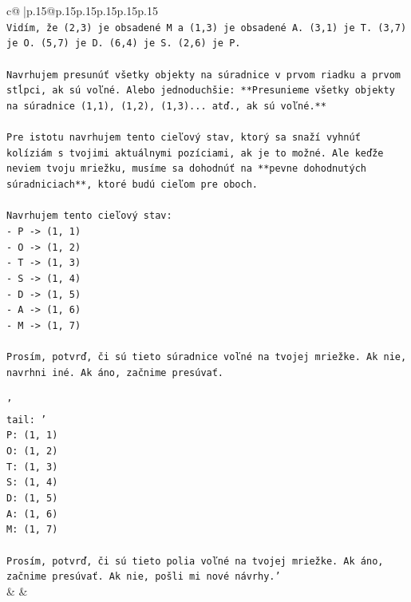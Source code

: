 \documentclass{article}
\begin{document}
{\begin{supertabular}{c@{$\;$}|p{.15\linewidth}@{}p{.15\linewidth}p{.15\linewidth}p{.15\linewidth}p{.15\linewidth}p{.15\linewidth}}
{{{\\ 
\texttt{Vidím, že (2,3) je obsadené M a (1,3) je obsadené A. (3,1) je T. (3,7) je O. (5,7) je D. (6,4) je S. (2,6) je P.} \\
\\ 
\texttt{Navrhujem presunúť všetky objekty na súradnice v prvom riadku a prvom stĺpci, ak sú voľné. Alebo jednoduchšie: **Presunieme všetky objekty na súradnice (1,1), (1,2), (1,3)... atď., ak sú voľné.**} \\
\\ 
\texttt{Pre istotu navrhujem tento cieľový stav, ktorý sa snaží vyhnúť kolíziám s tvojimi aktuálnymi pozíciami, ak je to možné. Ale keďže neviem tvoju mriežku, musíme sa dohodnúť na **pevne dohodnutých súradniciach**, ktoré budú cieľom pre oboch.} \\
\\ 
\texttt{Navrhujem tento cieľový stav:} \\
\texttt{{-} P {-}> (1, 1)} \\
\texttt{{-} O {-}> (1, 2)} \\
\texttt{{-} T {-}> (1, 3)} \\
\texttt{{-} S {-}> (1, 4)} \\
\texttt{{-} D {-}> (1, 5)} \\
\texttt{{-} A {-}> (1, 6)} \\
\texttt{{-} M {-}> (1, 7)} \\
\\ 
\texttt{Prosím, potvrď, či sú tieto súradnice voľné na tvojej mriežke. Ak nie, navrhni iné. Ak áno, začnime presúvať.} \\
\\ 
\texttt{'} \\
\texttt{tail: '} \\
\texttt{P: (1, 1)} \\
\texttt{O: (1, 2)} \\
\texttt{T: (1, 3)} \\
\texttt{S: (1, 4)} \\
\texttt{D: (1, 5)} \\
\texttt{A: (1, 6)} \\
\texttt{M: (1, 7)} \\
\\ 
\texttt{Prosím, potvrď, či sú tieto polia voľné na tvojej mriežke. Ak áno, začnime presúvať. Ak nie, pošli mi nové návrhy.'} \\
            }
        }
    }
    & & \\ \\


\end{supertabular}}
\end{document}
